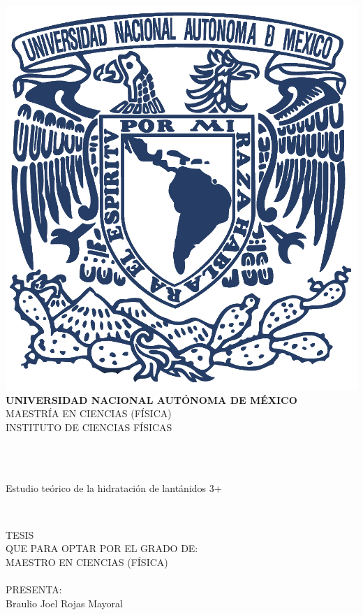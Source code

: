 \documentclass[12pt,letterpaper,twoside,openright,BCOR=1cm]{book}
\begin{document}
%
\begin{titlepage}
\begin{center}
\includegraphics[scale=.5]{unamazul.jpg}\\
\small{\textbf{UNIVERSIDAD NACIONAL AUT\'ONOMA DE M\'EXICO}}\\
\small{MAESTR\'IA EN CIENCIAS (F\'ISICA)}\\
\small{INSTITUTO DE CIENCIAS F\'ISICAS}\\
\begin{verbatim}


\end{verbatim}\\
\small{Estudio te\'orico de la hidrataci\'on de lant\'anidos 3+}\\
\begin{verbatim}

\end{verbatim}\\
\small{TESIS}\\
\small{QUE PARA OPTAR POR EL GRADO DE:}\\
\small{MAESTRO EN CIENCIAS (F\'ISICA)}\\
\hspace{2truecm}\\
\small{PRESENTA:}\\
\small{Braulio Joel Rojas Mayoral}\\
\begin{verbatim}



\end{verbatim}
\end{center}
\end{titlepage}
\end{document}
